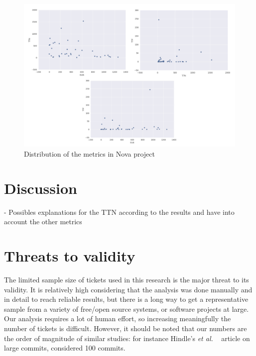 \documentclass[10pt, conference]{IEEEtran}
\begin{document}
\begin{figure}[ht]
\centering
\includegraphics[width=\columnwidth]{DistributionES_b.png}
\caption{Distribution of the metrics in Nova project}
\label{fig:graph3}       %
\end{figure}


\section{Discussion}
\label{sec:discussion}
- Possibles explanations for the TTN according to the results and have into account the other metrics


\section{Threats to validity}
\label{sec:threats}

The limited sample size of tickets used in this research is the major threat to its validity. It is relatively high considering that the analysis was done manually and in detail to reach reliable results, but there is a long way to get a representative sample from a variety of free/open source systems, or software projects at large. Our analysis requires a lot of human effort, so increasing meaningfully the number of tickets is difficult. However, it should be noted that our numbers are the order of magnitude of similar studies: for instance Hindle's \emph{et al.} ~\cite{hindle2008large} article on large commits, considered 100 commits.
\end{document}
